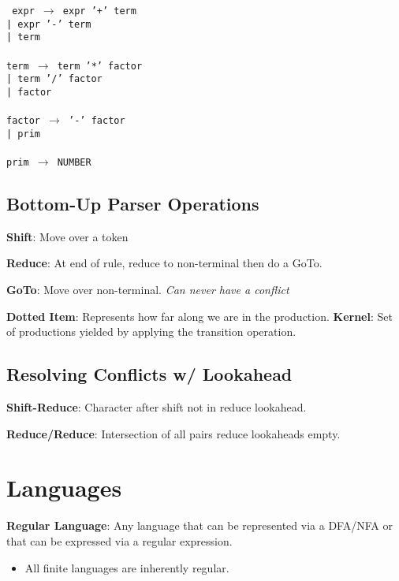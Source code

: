 \documentclass[10pt,twocolumn]{report}
\begin{document}
\texttt{%
  expr $\rightarrow$ expr '+' term\\
  \hbox{\hspace{30pt}}| expr '-' term\\
  \hbox{\hspace{30pt}}| term\\
  \\
  term $\rightarrow$ term '*' factor\\
  \hbox{\hspace{30pt}}| term '/' factor\\
  \hbox{\hspace{30pt}}| factor\\
  \\
  factor $\rightarrow$ '-' factor\\
  \hbox{\hspace{39pt}}| prim\\
  \\
  prim $\rightarrow$ NUMBER
}

\subsection*{Bottom-Up Parser Operations}

\textbf{Shift}: Move over a token

\textbf{Reduce}: At end of rule, reduce to non-terminal then do a GoTo.

\textbf{GoTo}: Move over non-terminal. \textit{Can never have a conflict}

\textbf{Dotted Item}: Represents how far along we are in the production. \textbf{Kernel}: Set of productions yielded by applying the transition operation.

\subsection*{Resolving Conflicts w/ Lookahead}
\textbf{Shift-Reduce}: Character after shift not in reduce lookahead.

\textbf{Reduce/Reduce}: Intersection of all pairs reduce lookaheads empty.

\section*{Languages}

\noindent
\textbf{Regular Language}: Any language that can be represented via a DFA/NFA or that can be expressed via a regular expression.
\begin{itemize}
  \item All finite languages are inherently regular.
\end{itemize}
\end{document}
